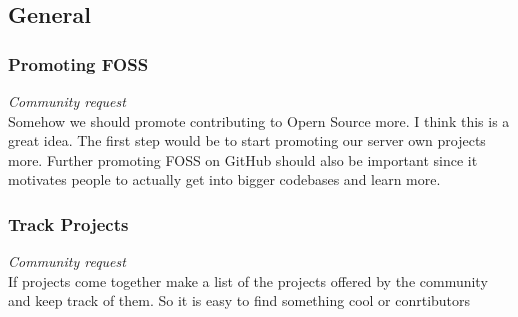 \documentclass{article}
\begin{document}
    \subsection{General}

    \subsubsection{Promoting FOSS}
    \textit{Community request} \\ \newline 
    Somehow we should promote contributing to Opern Source more. 
    I think this is a great idea. 
    The first step would be to start promoting our server own projects more.
    Further promoting FOSS on GitHub should also be important since it motivates people to actually get into bigger codebases and learn more.

    \subsubsection{Track Projects}
    \textit{Community request} \\ \newline 
    If projects come together make a list of the projects offered by the community and keep track of them.
    So it is easy to find something cool or conrtibutors
    
\end{document}
